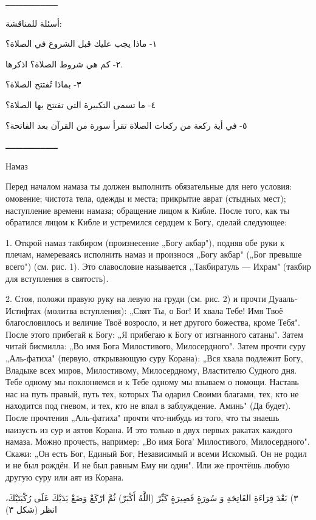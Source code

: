 \documentclass[a5paper]{article}
\begin{document}
ـــــــــــــــــــــ

أسئلة للمناقشة:

١- ماذا يجب عليك قبل الشروع في الصلاة؟

٢- كم هي شروط الصلاة؟ اذكرها.

٣- بماذا تُفتتح الصلاة؟

٤- ما تسمى التكبيرة التي تفتتح بها الصلاة؟

٥- في أية ركعة من ركعات الصلاة تقرأ سورة من القرآن بعد الفاتحة؟

ـــــــــــــــــــــ

Намаз

Перед началом намаза ты должен выполнить обязательные для него условия: омовение; чистота тела, одежды и места; прикрытие аврат (стыдных мест); наступление времени намаза; обращение лицом к Кибле. После того, как ты обратился лицом к Кибле и устремился сердцем к Богу, сделай следующее:

1. Открой намаз такбиром (произнесение „Богу акбар"), подняв обе руки к плечам, намереваясь исполнить намаз и произнося „Богу акбар" („Бог превыше всего") (см. рис. 1). Это славословие называется ,,Такбиратуль — Ихрам" (такбир для вступления в святость).

2. Стоя, положи правую руку на левую на груди (см. рис. 2) и прочти Дуааль-Истифтах (молитва вступления): „Свят Ты, о Бог! И хвала Тебе! Имя Твоё благословилось и величие Твоё возросло, и нет другого божества, кроме Тебя". После этого прибегай к Богу: „Я прибегаю к Богу от изгнанного сатаны". Затем читай бисмилла: „Во имя Бога Милостивого, Милосердного". Затем прочти суру „Аль-фатиха" (первую, открывающую суру Корана): „Вся хвала подлежит Богу, Владыке всех миров, Милостивому, Милосердному, Властителю Судного дня. Тебе одному мы поклоняемся и к Тебе одному мы взываем о помощи. Наставь нас на путь правый, путь тех, которых Ты одарил Своими благами, тех, кто не находится под гневом, и тех, кто не впал в заблуждение. Аминь" (Да будет). После прочтения „Аль-фатиха" прочти что-нибудь из того, что ты знаешь наизусть из сур и аятов Корана. И это только в двух первых ракатах каждого намаза. Можно прочесть, например: „Во имя Бога' Милостивого, Милосердного". Скажи: „Он есть Бог, Единый Бог, Независимый и всеми Искомый. Он не родил и не был рождён. И не был равным Ему ни один". Или же прочтёшь любую другую суру или аят из Корана.

٣) بَعْدَ قِرَاءَةِ الفَاتِحَةِ وَ سُورَةٍ قَصِيرَةٍ كَبِّرْ (اللَّهُ أَكْبَرْ) ثُمَّ ارْكَعْ وَضَعْ يَدَيْكَ عَلَى رُكْبَتَيْكَ، انظر (شكل ٣)
\end{document}
